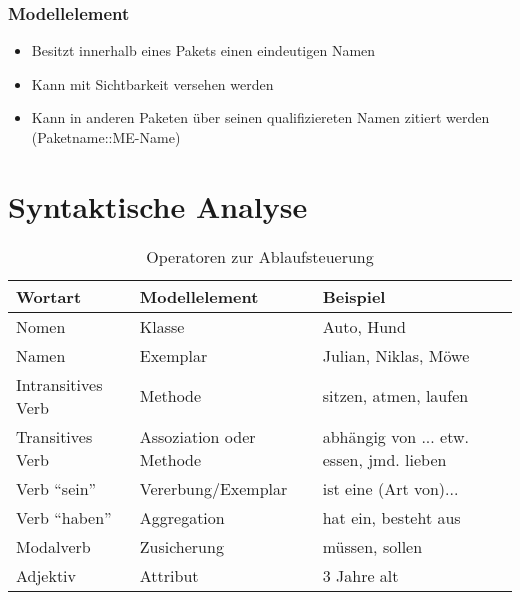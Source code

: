\subsubsection{Modellelement}
\begin{itemize}
    \item Besitzt innerhalb eines Pakets einen eindeutigen Namen
    \item Kann mit Sichtbarkeit versehen werden
    \item Kann in anderen Paketen über seinen qualifiziereten Namen zitiert werden (Paketname::ME-Name)
\end{itemize}


\section{Syntaktische Analyse}
\begin{table}[h]
\begin{tabular}{l|l|l}
Wortart            & Modellelement            & Beispiel                                 \\
\hline
Nomen              & Klasse                   & Auto, Hund                               \\
Namen              & Exemplar                 & Julian, Niklas, Möwe                     \\
Intransitives Verb & Methode                  & sitzen, atmen, laufen                    \\
Transitives Verb   & Assoziation oder Methode & abhängig von ... etw. essen, jmd. lieben \\
Verb ``sein''      & Vererbung/Exemplar       & ist eine (Art von)...                    \\
Verb ``haben''     & Aggregation              & hat ein, besteht aus                     \\
Modalverb          & Zusicherung              & müssen, sollen                           \\
Adjektiv           & Attribut                 & 3 Jahre alt               
\end{tabular}
\caption{Operatoren zur Ablaufsteuerung}
\label{tab:ablaufsteuerung2}
\end{table}

